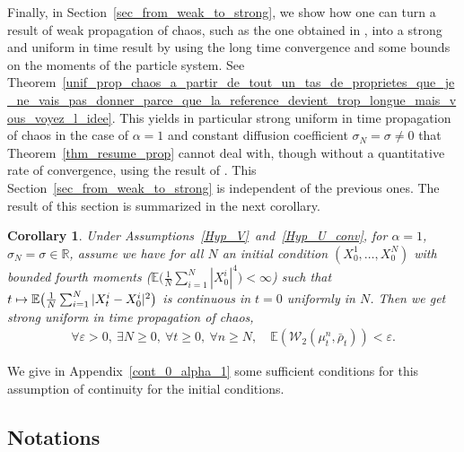\documentclass[JEP,XML,SOM,Unicode,published]{cedram}
\newcommand\mto{\mathchoice{\longmapsto}{\mapsto}{\mapsto}{\mapsto}}
\let\epsilon\varepsilon
\theoremstyle{plain}
\newtheorem{corollary}{Corollary}[section]
\theoremstyle{definition}
\begin{document}
Finally, in Section~\ref{sec_from_weak_to_strong}, we show how one can turn a result of weak propagation of chaos, such as the one obtained in \cite{Rogers_Shi, cepa_lepingle, Li_Li_Xie}, into a strong and uniform in time result by using the long time convergence and some bounds on the moments of the particle system. See Theorem~\ref{unif_prop_chaos_a_partir_de_tout_un_tas_de_proprietes_que_je_ne_vais_pas_donner_parce_que_la_reference_devient_trop_longue_mais_vous_voyez_l_idee}. This yields in particular strong uniform in time propagation of chaos in the case of $\alpha=1$ and constant diffusion coefficient $\sigma_N=\sigma\neq0$ that Theorem~\ref{thm_resume_prop} cannot deal with, though without a quantitative rate of convergence, using the result of \cite{cepa_lepingle}. This Section~\ref{sec_from_weak_to_strong} is independent of the previous ones. The result of this section is summarized in the next corollary.

\begin{corollary}
Under Assumptions~\ref{Hyp_V}~and~\ref{Hyp_U_conv}, for $\alpha=1$, $\sigma_N= \sigma\in\mathbb{R}$, assume we have for all $N$ an initial condition $(X^1_0,\dots,X^N_0)$ with bounded fourth moments (\ie $\mathbb{E}\bigl(\frac{1}{N}\sum_{i=1}^N|X^i_0|^4\bigr)<\infty$) such that ${t\mto\mathbb{E}\bigl(\frac{1}{N}\sum_{i=1}^N|X^i_t-X^i_0|^2\bigr)}$ is continuous in $t=0$ uniformly in $N$. Then we get strong uniform in time propagation of chaos, \ie
\begin{align*}
\forall \epsilon>0,\ \exists N\geq0,\ \forall t\geq0,\ \forall n\geq N,\quad \mathbb{E}\left(\mathcal{W}_2\left(\mu^n_t,\bar{\rho}_t\right)\right)<\epsilon.
\end{align*}
\end{corollary}

We give in Appendix~\ref{cont_0_alpha_1} some sufficient conditions for this assumption of continuity for the initial conditions.

\subsection*{Notations}
\end{document}
